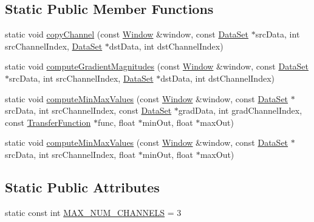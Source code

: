 \subsection*{\-Static \-Public \-Member \-Functions}
\begin{DoxyCompactItemize}
\item 
static void \hyperlink{class_verdi_1_1_data_set_a156690144b3970c1f13c34b6ceb37b62}{copy\-Channel} (const \hyperlink{struct_verdi_1_1_data_set_1_1_window}{\-Window} \&window, const \hyperlink{class_verdi_1_1_data_set}{\-Data\-Set} $\ast$src\-Data, int src\-Channel\-Index, \hyperlink{class_verdi_1_1_data_set}{\-Data\-Set} $\ast$dst\-Data, int dst\-Channel\-Index)
\item 
static void \hyperlink{class_verdi_1_1_data_set_a40d0ce7eb25518cc444e4908ab1b58f7}{compute\-Gradient\-Magnitudes} (const \hyperlink{struct_verdi_1_1_data_set_1_1_window}{\-Window} \&window, const \hyperlink{class_verdi_1_1_data_set}{\-Data\-Set} $\ast$src\-Data, int src\-Channel\-Index, \hyperlink{class_verdi_1_1_data_set}{\-Data\-Set} $\ast$dst\-Data, int dst\-Channel\-Index)
\item 
static void \hyperlink{class_verdi_1_1_data_set_af084277979dbf65f50e1957a11ad2f08}{compute\-Min\-Max\-Values} (const \hyperlink{struct_verdi_1_1_data_set_1_1_window}{\-Window} \&window, const \hyperlink{class_verdi_1_1_data_set}{\-Data\-Set} $\ast$src\-Data, int src\-Channel\-Index, const \hyperlink{class_verdi_1_1_data_set}{\-Data\-Set} $\ast$grad\-Data, int grad\-Channel\-Index, const \hyperlink{class_verdi_1_1_transfer_function}{\-Transfer\-Function} $\ast$func, float $\ast$min\-Out, float $\ast$max\-Out)
\item 
static void \hyperlink{class_verdi_1_1_data_set_a875f015107f5a2d2ede9758f8e10add6}{compute\-Min\-Max\-Values} (const \hyperlink{struct_verdi_1_1_data_set_1_1_window}{\-Window} \&window, const \hyperlink{class_verdi_1_1_data_set}{\-Data\-Set} $\ast$src\-Data, int src\-Channel\-Index, float $\ast$min\-Out, float $\ast$max\-Out)
\end{DoxyCompactItemize}
\subsection*{\-Static \-Public \-Attributes}
\begin{DoxyCompactItemize}
\item 
static const int \hyperlink{class_verdi_1_1_data_set_a65d8e95a80ebdfd18ac16fd15101da3c}{\-M\-A\-X\-\_\-\-N\-U\-M\-\_\-\-C\-H\-A\-N\-N\-E\-L\-S} = 3
\end{DoxyCompactItemize}
